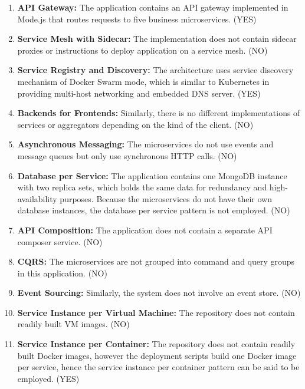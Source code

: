 \documentclass{Configuration_Files/PoliMi3i_thesis}
\begin{document}
\begin{enumerate}
    \item \textbf{API Gateway:} The application contains an API gateway implemented in Mode.js that routes requests to five business microservices. (YES)
    
    \item \textbf{Service Mesh with Sidecar:} The implementation does not contain sidecar proxies or instructions to deploy application on a service mesh. (NO)
    
    \item \textbf{Service Registry and Discovery:} The architecture uses service discovery mechanism of Docker Swarm mode, which is similar to Kubernetes in providing multi-host networking and embedded DNS server. (YES)
    
    \item \textbf{Backends for Frontends:} Similarly, there is no different implementations of services or aggregators depending on the kind of the client. (NO)
    
    \item \textbf{Asynchronous Messaging:} The microservices do not use events and message queues but only use synchronous HTTP calls. (NO)
    
    \item \textbf{Database per Service:} The application contains one MongoDB instance with two replica sets, which holds the same data for redundancy and high-availability purposes.
    Because the microservices do not have their own database instances, the database per service pattern is not employed. (NO)
    
    \item \textbf{API Composition:} The application does not contain a separate API composer service. (NO)
    
    \item \textbf{CQRS:} The microservices are not grouped into command and query groups in this application. (NO)
    
    \item \textbf{Event Sourcing:} Similarly, the system does not involve an event store. (NO)
    
    \item \textbf{Service Instance per Virtual Machine:} The repository does not contain readily built VM images. (NO)
    
    \item \textbf{Service Instance per Container:} The repository does not contain readily built Docker images, however the deployment scripts build one Docker image per service, hence the service instance per container pattern can be said to be employed. (YES)
    

\end{enumerate}
\end{document}
